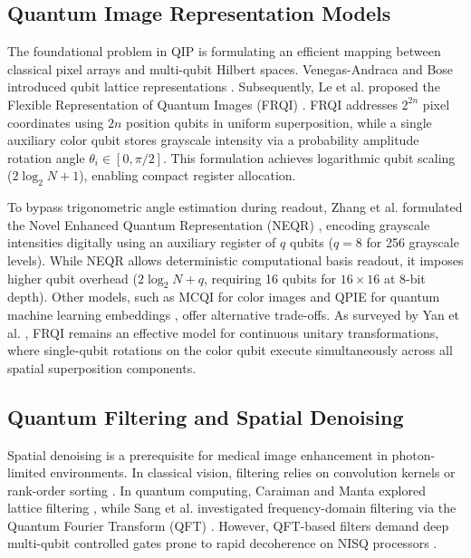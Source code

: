 \documentclass[12pt,onecolumn,draftclsnofoot]{IEEEtran}
\begin{document}
\subsection{Quantum Image Representation Models}
The foundational problem in QIP is formulating an efficient mapping between classical pixel arrays and multi-qubit Hilbert spaces. Venegas-Andraca and Bose introduced qubit lattice representations \cite{venegas2012quantum}. Subsequently, Le et al. proposed the Flexible Representation of Quantum Images (FRQI) \cite{le2011flexible}. FRQI addresses $2^{2n}$ pixel coordinates using $2n$ position qubits in uniform superposition, while a single auxiliary color qubit stores grayscale intensity via a probability amplitude rotation angle $\theta_i \in [0, \pi/2]$. This formulation achieves logarithmic qubit scaling ($2\log_2 N + 1$), enabling compact register allocation.

To bypass trigonometric angle estimation during readout, Zhang et al. formulated the Novel Enhanced Quantum Representation (NEQR) \cite{zhang2013neqr}, encoding grayscale intensities digitally using an auxiliary register of $q$ qubits ($q=8$ for 256 grayscale levels). While NEQR allows deterministic computational basis readout, it imposes higher qubit overhead ($2\log_2 N + q$, requiring 16 qubits for $16\times16$ at 8-bit depth). Other models, such as MCQI for color images \cite{iliyasu2012framework} and QPIE for quantum machine learning embeddings \cite{biamonte2017quantum}, offer alternative trade-offs. As surveyed by Yan et al. \cite{yan2017survey}, FRQI remains an effective model for continuous unitary transformations, where single-qubit rotations on the color qubit execute simultaneously across all spatial superposition components.

\subsection{Quantum Filtering and Spatial Denoising}
Spatial denoising is a prerequisite for medical image enhancement in photon-limited environments. In classical vision, filtering relies on convolution kernels or rank-order sorting \cite{boyat2015review}. In quantum computing, Caraiman and Manta explored lattice filtering \cite{caraiman2014image}, while Sang et al. investigated frequency-domain filtering via the Quantum Fourier Transform (QFT) \cite{sang2017quantum}. However, QFT-based filters demand deep multi-qubit controlled gates prone to rapid decoherence on NISQ processors \cite{preskill2018quantum}.
\end{document}
